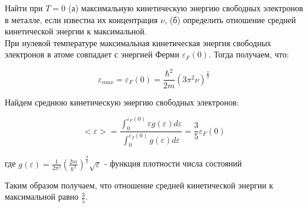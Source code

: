 \documentclass[__main__.tex]{subfiles}
\begin{document}
Найти при $T=0$ (а) максимальную кинетическую энергию свободных электронов в металле, если известна их концентрация $\nu$, (б) определить отношение средней кинетической энергии к максимальной.\\ 

При нулевой температуре максимальная кинетическая энергия свободных электронов в атоме совпадает с энергией Ферми $\varepsilon_F(0)$. Тогда получаем, что:

$$\varepsilon_{max} = \varepsilon_F(0) = \frac{\hbar^2}{2m}(3\pi^2\nu)^{\frac{2}{3}}$$

Найдем среднюю кинетическую энергию свободных электронов:

$$<\varepsilon> = \frac{\int_0^{\varepsilon_F(0)}\varepsilon g(\varepsilon) d\varepsilon}{\int_0^{\varepsilon_F(0)}g(\varepsilon) d\varepsilon} = \frac{3}{5}\varepsilon_F(0)$$

где $g(\varepsilon) = \frac{1}{2\pi^2}\left(\frac{2m}{\hbar^2}\right)^{\frac{3}{2}}\sqrt{\varepsilon}$ - функция плотности числа состояний

Таким образом получаем, что отношение средней кинетической энергии к максимальной равно $\frac{3}{5}$.
\end{document}
